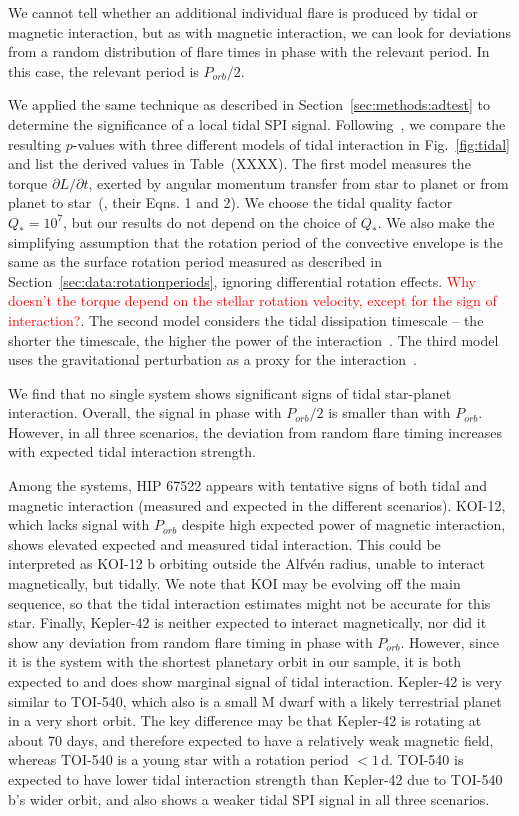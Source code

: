 \documentclass[twocolumn]{aastex631}
\begin{document}
We cannot tell whether an additional individual flare is produced by tidal or magnetic interaction, but as with magnetic interaction, we can look for deviations from a random distribution of flare times in phase with the relevant period. In this case, the relevant period is $P_{orb}/2$.

We applied the same technique as described in Section~\ref{sec:methods:adtest} to determine the significance of a local tidal SPI signal. Following~\citet{ilic2022tidal}, we compare the resulting $p$-values with three different models of tidal interaction in Fig.~\ref{fig:tidal} and list the derived values in Table~(XXXX). The first model measures the torque $\partial L / \partial t$, exerted by angular momentum transfer from star to planet or from planet to star~(\citealt{penev2012constraining}, their Eqns. 1 and 2). We choose the tidal quality factor $Q_*=10^7$, but our results do not depend on the choice of $Q_*$. We also make the simplifying assumption that the rotation period of the convective envelope is the same as the surface rotation period measured as described in Section~\ref{sec:data:rotationperiods}, ignoring differential rotation effects. \textcolor{red}{Why doesn't the torque depend on the stellar rotation velocity, except for the sign of interaction?}. The second model considers the tidal dissipation timescale -- the shorter the timescale, the higher the power of the interaction~\citep{albrecht2012obliquities}. The third model uses the gravitational perturbation as a proxy for the interaction~\citep{cuntz2000stellar}.

We find that no single system shows significant signs of tidal star-planet interaction. Overall, the signal in phase with $P_{orb}/2$ is smaller than with $P_{orb}$. However, in all three scenarios, the deviation from random flare timing increases with expected tidal interaction strength. 

Among the systems, HIP 67522 appears with tentative signs of both tidal and magnetic interaction (measured and expected in the different scenarios). KOI-12, which lacks signal with $P_{orb}$ despite high expected power of magnetic interaction, shows elevated expected and measured tidal interaction. This could be interpreted as KOI-12 b orbiting outside the Alfv\'en radius, unable to interact magnetically, but tidally. We note that KOI may be evolving off the main sequence, so that the tidal interaction estimates might not be accurate for this star. Finally, Kepler-42 is neither expected to interact magnetically, nor did it show any deviation from random flare timing in phase with $P_{orb}$. However, since it is the system with the shortest planetary orbit in our sample, it is both expected to and does show marginal signal of tidal interaction. Kepler-42 is very similar to TOI-540, which also is a small M dwarf with a likely terrestrial planet in a very short orbit. The key difference may be that Kepler-42 is rotating at about 70 days, and therefore expected to have a relatively weak magnetic field, whereas TOI-540 is a young star with a rotation period $<1\,$d. TOI-540 is expected to have lower tidal interaction strength than Kepler-42 due to TOI-540 b's wider orbit, and also shows a weaker tidal SPI signal in all three scenarios. 
\end{document}

